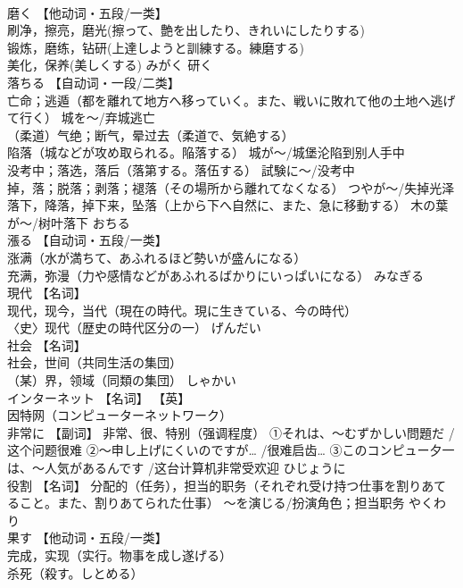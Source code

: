 \documentclass[8pt]{extreport}
\begin{document}
\begin{CJK}{UTF8}{min}
\\	磨く	【他动词・五段/一类】 
\\	刷净，擦亮，磨光(擦って、艶を出したり、きれいにしたりする) 
\\	锻炼，磨练，钻研(上達しようと訓練する。練磨する) 
\\	美化，保养(美しくする)	みがく	研く
\\	落ちる	【自动词・一段/二类】 
\\	亡命；逃遁（都を離れて地方へ移っていく。また、戦いに敗れて他の土地へ逃げて行く） 城を～/弃城逃亡 
\\	（柔道）气绝；断气，晕过去（柔道で、気絶する） 
\\	陷落（城などが攻め取られる。陥落する） 城が～/城堡沦陷到别人手中 
\\	没考中；落选，落后（落第する。落伍する） 試験に～/没考中 
\\	掉，落；脱落；剥落；褪落（その場所から離れてなくなる） つやが～/失掉光泽 
\\	落下，降落，掉下来，坠落（上から下へ自然に、また、急に移動する） 木の葉が～/树叶落下	おちる	
\\	漲る	【自动词・五段/一类】 
\\	涨满（水が満ちて、あふれるほど勢いが盛んになる） 
\\	充满，弥漫（力や感情などがあふれるばかりにいっぱいになる）	みなぎる	
\\	現代	【名词】 
\\	现代，现今，当代（現在の時代。現に生きている、今の時代） 
\\	〈史〉现代（歴史の時代区分の一）	げんだい	
\\	社会	【名词】 
\\	社会，世间（共同生活の集団） 
\\	（某）界，领域（同類の集団）	しゃかい	
\\	インターネット	【名词】 【英】
\\	因特网（コンピューターネットワーク）		
\\	非常に	【副词】 非常、很、特别（强调程度） ①それは、〜むずかしい問題だ /这个问题很难 ②〜申し上げにくいのですが… /很难启齿… ③このコンピュー夕一は、〜人気があるんです /这台计算机非常受欢迎	ひじょうに	
\\	役割	【名词】 分配的（任务），担当的职务（それぞれ受け持つ仕事を割りあてること。また、割りあてられた仕事） 〜を演じる/扮演角色；担当职务	やくわり	
\\	果す	【他动词・五段/一类】 
\\	完成，实现（实行。物事を成し遂げる） 
\\	杀死（殺す。しとめる） 

\end{CJK}
\end{document}
